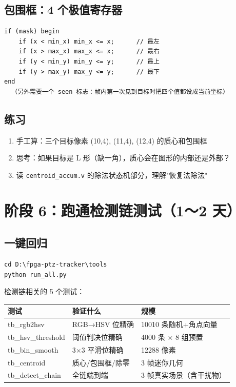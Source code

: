 \documentclass[11pt]{ctexart}
\newcommand{\code}[1]{\texttt{#1}}
\begin{document}
\subsection{包围框：4 个极值寄存器}

\begin{Verbatim}[frame=single,fontsize=\small]
if (mask) begin
    if (x < min_x) min_x <= x;      // 最左
    if (x > max_x) max_x <= x;      // 最右
    if (y < min_y) min_y <= y;      // 最上
    if (y > max_y) max_y <= y;      // 最下
end
  （另外需要一个 seen 标志：帧内第一次见到目标时把四个值都设成当前坐标）
\end{Verbatim}

\subsection{练习}

\begin{enumerate}
  \item 手工算：三个目标像素 (10,4), (11,4), (12,4) 的质心和包围框
  \item 思考：如果目标是 L 形（缺一角），质心会在图形的内部还是外部？
  \item 读 \code{centroid\_accum.v} 的除法状态机部分，理解"恢复法除法"
\end{enumerate}

\section{阶段 6：跑通检测链测试（1～2 天）}

\subsection{一键回归}

\begin{Verbatim}[frame=single,fontsize=\small]
cd D:\fpga-ptz-tracker\tools
python run_all.py
\end{Verbatim}

检测链相关的 5 个测试：

\begin{center}
\renewcommand{\arraystretch}{1.25}
\begin{tabular}{lll}
\toprule
\rowcolor{rowtint}\textbf{测试} & \textbf{验证什么} & \textbf{规模} \\
\midrule
tb\_rgb2hsv & RGB→HSV 位精确 & 10010 条随机+角点向量 \\
tb\_hsv\_threshold & 阈值判决位精确 & 4000 条 × 8 组预置 \\
tb\_bin\_smooth & 3×3 平滑位精确 & 12288 像素 \\
tb\_centroid & 质心/包围框/除零 & 3 帧迷你几何 \\
tb\_detect\_chain & 全链端到端 & 3 帧真实场景（含干扰物） \\
\bottomrule
\end{tabular}
\end{center}
\end{document}
